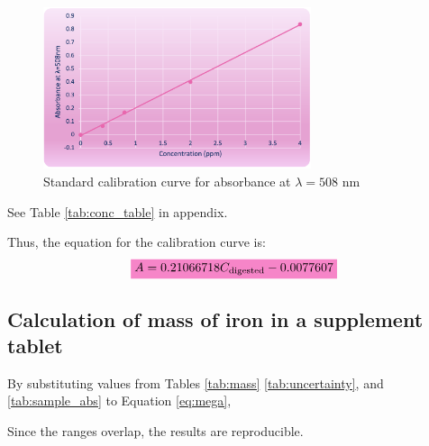 \documentclass[main.tex]{subfiles}
\begin{document}
\begin{figure}[H]
    \centering
    \includegraphics[width=0.7\textwidth]{standard_curve.png}
    \caption{Standard calibration curve for absorbance at $\lambda=508$ nm}
    \label{fig:cal_curve}
\end{figure}
See Table \ref{tab:conc_table} in appendix.



Thus, the equation for the calibration curve is:
\begin{equation*}
    \mathcolorbox{Lavender}{A = 0.21066718C_{\text{digested}} -0.0077607}
\end{equation*}

\subsection*{Calculation of mass of iron in a supplement tablet}
By substituting values from Tables \ref{tab:mass} \ref{tab:uncertainty}, and \ref{tab:sample_abs} to Equation \ref{eq:mega},



Since the ranges overlap, the results are reproducible.
\end{document}
